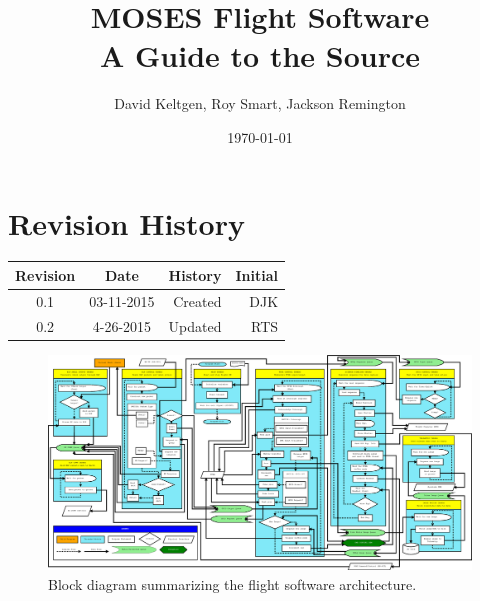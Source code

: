 \documentclass[11pt,titlepage]{article}
\title{MOSES Flight Software \\ A Guide to the Source}
\author{David Keltgen, Roy Smart, Jackson Remington}
\date{\today}
\begin{document}
\maketitle
\tableofcontents
\newpage

\section[Revisions]{Revision History}
	\begin{longtable}{|c|c|r|r|}
		\hline
		Revision	&	Date	&	\multicolumn{1}{c|}{History}	&	\multicolumn{1}{c|}{Initial}\\
		\hline
		0.1	&	03-11-2015	&	Created	& DJK	\\
		\hline
		0.2 & 4-26-2015 & Updated & RTS \\
		\hline

	\end{longtable}
	
\newpage






\begin{landscape}
\begin{figure}[h!]
\centering
\includegraphics[width=24.5cm]{images/mfsw_block}
\caption{Block diagram summarizing the flight software architecture.}
\end{figure}
\end{landscape}








\end{document}
